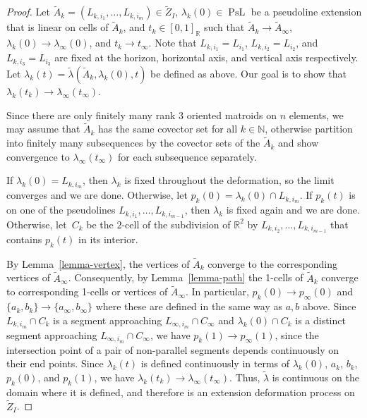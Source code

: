 \documentclass[JEP,XML,SOM,Unicode,NoFloatCountersInSection,published]{cedram}
\theoremstyle{remark}
\let\mb\mathbb
\DeclareMathOperator{\curves}{PsL}
\begin{document}
\begin{proof}
Let $\tilde A_k = (L_{k,i_1},\dots,L_{k,i_m}) \in \tilde Z_{I}$, $\lambda_k(0) \in \curves$ be a pseudoline extension that is linear on cells of $\tilde A_k$, and $t_k \in [0,1]_\mb{R}$ such that $\tilde A_k \to \tilde A_\infty$, $\lambda_k(0) \to \lambda_\infty(0)$, and $t_k \to t_\infty$.
Note that $L_{k,i_1} = L_{i_1}$, $L_{k,i_2} = L_{i_2}$, and $L_{k,i_3} = L_{i_3}$ are fixed at the horizon, horizontal axis, and vertical axis respectively.
Let $\lambda_k(t) = \tilde \lambda(\tilde A_k,\lambda_k(0),t)$ be defined as above.
Our goal is to show that $\lambda_k(t_k) \to \lambda_\infty(t_\infty)$.

Since there are only finitely many rank $3$ oriented matroids on $n$ elements, we may assume that $\tilde A_k$ has the same covector set for all $k \in \mb{N}$, otherwise partition into finitely many subsequences by the covector sets of the $\tilde A_k$ and show convergence to $\lambda_\infty(t_\infty)$ for each subsequence separately.

If $\lambda_k(0) = L_{k,i_m}$, then $\lambda_k$ is fixed throughout the deformation, so the limit converges and we are done.
Otherwise, let $p_k(0) = \lambda_k(0) \cap L_{k,i_m}$.
If $p_{k}(t)$ is on one of the pseudolines $L_{k,i_1},\dots,L_{k,i_{m-1}}$, then $\lambda_k$ is fixed again and we are done.
Otherwise, let~$C_k$ be the $2$-cell of the subdivision of $\mb{R}^2$ by $L_{k,i_2},\dots,L_{k,i_{m-1}}$ that contains $p_{k}(t)$ in its interior.

By Lemma~\ref{lemma-vertex}, the vertices of $\tilde A_k$ converge to the corresponding vertices of $\tilde A_\infty$.
Consequently, by Lemma~\ref{lemma-path} the 1-cells of $\tilde A_k$ converge to corresponding 1-cells or vertices of $\tilde A_\infty$.
In particular, $p_k(0) \to p_\infty(0)$ and $\{a_k,b_k\} \to \{a_\infty,b_\infty\}$ where these are defined in the same way as $a,b$ above.
Since $L_{k,i_m} \cap C_k$ is a segment approaching $L_{\infty,i_m} \cap C_\infty$ and $\lambda_k(0) \cap C_k$ is a distinct segment approaching $L_{\infty,i_m} \cap C_\infty$, we have $p_k(1) \to p_\infty(1)$, since the intersection point of a pair of non-parallel segments depends continuously on their end points.
Since $\lambda_k(t)$ is defined continuously in terms of $\lambda_k(0)$, $a_k$, $b_k$, $p_k(0)$, and $p_k(1)$, we have $\lambda_k(t_k) \to \lambda_\infty(t_\infty)$.
Thus, $\tilde \lambda$ is continuous on the domain where it is defined, and therefore is an extension deformation process on~$\tilde Z_I$.
\end{proof}
\end{document}
